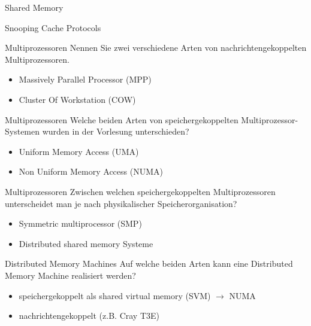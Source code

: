 \begin{defi}{Shared Memory}
\begin{defi}{Snooping Cache Protocols}
        \begin{aufgabe}{Multiprozessoren}
            Nennen Sie zwei verschiedene Arten von nachrichtengekoppelten Multiprozessoren.
            \tcblower
            \begin{itemize}
                \item Massively Parallel Processor (MPP)
                \item Cluster Of Workstation (COW)
            \end{itemize}
        \end{aufgabe}

        \begin{aufgabe}{Multiprozessoren}
            Welche beiden Arten von speichergekoppelten Multiprozessor-Systemen wurden in der Vorlesung unterschieden?
            \tcblower
            \begin{itemize}
                \item Uniform Memory Access (UMA)
                \item Non Uniform Memory Access (NUMA)
            \end{itemize}
        \end{aufgabe}

        \begin{aufgabe}{Multiprozessoren}
            Zwischen welchen speichergekoppelten Multiprozessoren unterscheidet man je nach physikalischer Speicherorganisation?
            \tcblower
            \begin{itemize}
                \item Symmetric multiprocessor (SMP)
                \item Distributed shared memory Systeme
            \end{itemize}
        \end{aufgabe}

        \begin{aufgabe}{Distributed Memory Machines}
            Auf welche beiden Arten kann eine Distributed Memory Machine realisiert werden?
            \tcblower
            \begin{itemize}
                \item speichergekoppelt als shared virtual memory (SVM) $\to$ NUMA
                \item nachrichtengekoppelt (z.B. Cray T3E)
            \end{itemize}
        \end{aufgabe}


\end{defi}
\end{defi}
